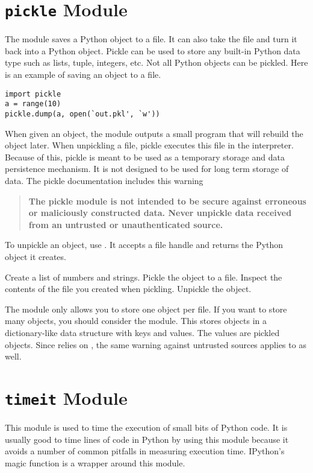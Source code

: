 \section*{\texttt{pickle} Module}
The  module saves a Python object to a file.
It can also take the file and turn it back into a Python object.
Pickle can be used to store any built-in Python data type such as lists, tuple, integers, etc.
Not all Python objects can be pickled.
Here is an example of saving an object to a file.
\begin{lstlisting}
import pickle
a = range(10)
pickle.dump(a, open(`out.pkl', `w'))
\end{lstlisting}
When given an object, the  module outputs a small program that will rebuild the object later.
When unpickling a file, pickle executes this file in the interpreter.
Because of this, pickle is meant to be used as a temporary storage and data persistence mechanism.
It is not designed to be used for long term storage of data.
The pickle documentation includes this warning
\begin{quote}
\textbf{The pickle module is not intended to be secure against erroneous or maliciously constructed data.
Never unpickle data received from an untrusted or unauthenticated source.}
\end{quote}
To unpickle an object, use .
It accepts a file handle and returns the Python object it creates.

\begin{problem}
Create a list of numbers and strings.
Pickle the object to a file.
Inspect the contents of the file you created when pickling.
Unpickle the object.
\end{problem}

The  module only allows you to store one object per file.
If you want to store many objects, you should consider the  module.
This stores objects in a dictionary-like data structure with keys and values.
The values are pickled objects.
Since  relies on , the same warning against untrusted sources applies to  as well.

\section*{\texttt{timeit} Module}
This module is used to time the execution of small bits of Python code.
It is usually good to time lines of code in Python by using this module because it avoids a number of common pitfalls in measuring execution time.
IPython's  magic function is a wrapper around this module.

